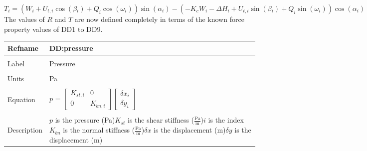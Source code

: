 \documentclass[12pt]{article}
\begin{document}
\begin{dmath}
T_{i}=\left(W_{i}+{U_{t,i}} \cos\left(\beta{}_{i}\right)+Q_{i} \cos\left(\omega{}_{i}\right)\right) \sin\left(\alpha{}_{i}\right)-\left(-{K_{c}} W_{i}-{\Delta{}H}_{i}+{U_{t,i}} \sin\left(\beta{}_{i}\right)+Q_{i} \sin\left(\omega{}_{i}\right)\right) \cos\left(\alpha{}_{i}\right)
\end{dmath}
The values of $R$ and $T$ are now defined completely in terms of the known force property values of DD1 to DD9.
~\newline
\noindent \begin{minipage}{\textwidth}
\begin{tabular}{p{} p{}}
\toprule \textbf{Refname} & \textbf{DD:pressure}
\label{DD:pressure}
\\ \midrule \\
Label & Pressure
\\ \midrule \\
Units & Pa
\\ \midrule \\
Equation & $p$ = $\begin{bmatrix}
{K_{st,i}} & 0\\
0 & {K_{bn,i}}
\end{bmatrix} \begin{bmatrix}
{\delta{}x}_{i}\\
{\delta{}y}_{i}
\end{bmatrix}$
\\ \midrule \\
Description & $p$ is the pressure (Pa)\newline${K_{st}}$ is the shear stiffness ($\frac{\text{Pa}}{\text{m}}$)\newline$i$ is the index\newline${K_{bn}}$ is the normal stiffness ($\frac{\text{Pa}}{\text{m}}$)\newline$\delta{}x$ is the displacement (m)\newline$\delta{}y$ is the displacement (m)
\\ \bottomrule \end{tabular}
\end{minipage}\\
~\newline
\end{document}

